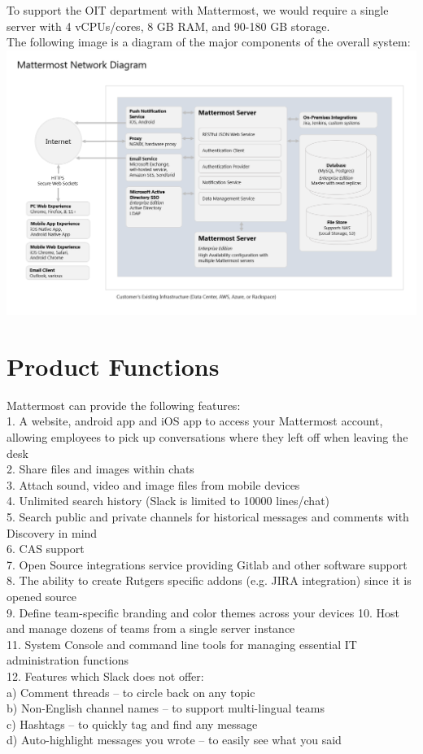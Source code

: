 \documentclass{scrreprt}
\newcommand\tab[1][0.5cm]{\hspace*{#1}}
\begin{document}
To support the OIT department with Mattermost, we would require a single server
with 4 vCPUs/cores, 8 GB RAM, and 90-180 GB storage.\\

The following image is a diagram of the major components of the overall system:
\includegraphics[scale=0.5, width=\textwidth]{mattermost-diagram.png}

\section{Product Functions}
Mattermost can provide the following features:\\
\tab 1. A website, android app and iOS app to access your Mattermost
account, allowing \tab employees to pick up conversations where they left off when
leaving the desk\\
\tab 2. Share files and images within chats\\
\tab 3. Attach sound, video and image files from mobile devices\\
\tab 4. Unlimited search history (Slack is limited to 10000 lines/chat)\\
\tab 5. Search public and private channels for historical messages and
comments with Discovery in mind\\
\tab 6. CAS support\\
\tab 7. Open Source integrations service providing Gitlab and other software
support\\
\tab 8. The ability to create Rutgers specific addons (e.g. JIRA integration) since
it is \tab opened source\\
\tab 9. Define team-specific branding and color themes across your devices
\tab 10. Host and manage dozens of teams from a single server instance\\
\tab 11. System Console and command line tools for managing essential IT
administration \tab functions\\
\tab 12. Features which Slack does not offer:\\
\tab\tab a) Comment threads – to circle back on any topic\\
\tab\tab b) Non-English channel names – to support multi-lingual teams\\
\tab\tab c) Hashtags – to quickly tag and find any message\\
\tab\tab d) Auto-highlight messages you wrote – to easily see what you said\\
\end{document}
